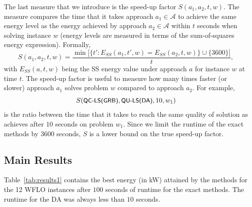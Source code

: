 \documentclass[preprint,12pt]{elsarticle}
\newcommand{\qclsgrb}{{\sf {\small QC-LS(GRB)\xspace}}}
\newcommand{\qulsda}{{\sf {\small QU-LS(DA)\xspace}}}
\begin{document}
The last measure that we introduce is the speed-up factor $S(a_1, a_2, t, w)$. The measure compares the time that it takes
approach $a_1 \in \mathcal{A}$ to
achieve the same energy level as the energy achieved by approach $a_2 \in \mathcal{A}$
within $t$ seconds when solving instance $w$ (energy levels are measured in terms of the sum-of-squares energy expression). 
Formally, \begin{equation} S(a_1, a_2, t, w) = \frac{\min \big[\{ t' : E_{SS}(a_1, t',w) = E_{SS}(a_2, t, w) \} \cup \{3600\} \big] }{t}, \label{eq:speedup} \end{equation}
with $E_{SS}(a, t, w)$ being the SS energy value under approach $a$ for instance $w$ at time $t$. The speed-up factor 
is useful to measure how many times faster (or slower) approach $a_1$ solves problem $w$ compared to approach $a_2$.   
For example, $$S(\mbox{\emph{\qclsgrb}}, \mbox{\emph{\qulsda}}, 10, w_1)$$ is the ratio between the time that it takes \qclsgrb{} to 
reach the same quality of solution as \qulsda{} achieves after $10$ seconds on problem $w_1$. Since
we limit the runtime of the exact methods by $3600$ seconds, $S$ is a lower bound on the true speed-up factor. 


\subsection{Main Results}

Table~\ref{tab:results1} contains the best energy (in kW) attained by the methods
for the 12 WFLO instances after $100$ seconds of runtime for the exact methods. 
The runtime for the DA was always less than $10$ seconds.
\end{document}
